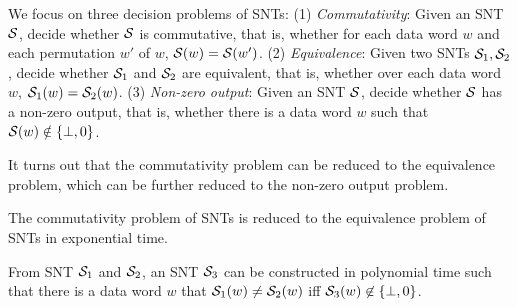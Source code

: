 


%
%
%




We focus on three decision problems of SNTs: (1) \emph{Commutativity}: Given an SNT ${\mathcal{S} }$, decide whether ${\mathcal{S} }$ is commutative, that is, whether for each data word $w$ and each permutation $w'$ of $w$, ${\mathcal{S} }(w)={\mathcal{S} }(w')$. (2) \emph{Equivalence}: Given two SNTs ${\mathcal{S} }_1,{\mathcal{S} }_2$, decide whether ${\mathcal{S} }_1$ and ${\mathcal{S} }_2$ are equivalent, that is, whether over each data word $w$, ${\mathcal{S} }_1(w)={\mathcal{S} }_2(w)$. (3) \emph{Non-zero output}: Given an SNT ${\mathcal{S} }$, decide whether ${\mathcal{S} }$ has a non-zero output, that is, whether there is a data word $w$ such that ${\mathcal{S} }(w)\notin \{\bot, 0\}$. 

It turns out that the commutativity problem can be reduced to the equivalence problem, which can be further reduced to the non-zero output problem.

\begin{proposition}\label{prop-snt-cmm-to-eqv}
The commutativity problem of SNTs is reduced to the equivalence problem of SNTs in exponential time. 
\end{proposition}
\begin{proposition}\label{prop-snt-eqv-to-nzero}
From SNT ${\mathcal{S} }_1$ and ${\mathcal{S} }_2$, an SNT ${\mathcal{S} }_3$ can be constructed in polynomial time such that there is a data word $w$ that ${\mathcal{S} }_1(w) \neq {\mathcal{S} }_2(w)$ iff ${\mathcal{S} }_3(w) \not\in \{\bot,0\}$. 
\end{proposition}


